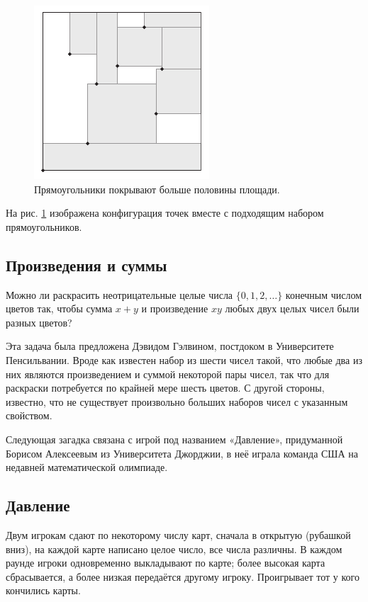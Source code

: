 \begin{figure}[htb!]
\centering
\includegraphics[scale=1]{pics/square}
\caption{Прямоугольники покрывают больше половины площади.}
\label{pic:square}
\end{figure}

На рис. \ref{pic:square} изображена конфигурация точек вместе с подходящим набором прямоугольников.

\subsection*{Произведения и суммы}

Можно ли раскрасить неотрицательные целые числа $\{0,1,2,\dots\}$ конечным числом цветов так, чтобы сумма $x+y$ и произведение $xy$ любых двух целых чисел были разных цветов?

\medskip

Эта задача была предложена Дэвидом Гэлвином, постдоком в Университете Пенсильвании.
Вроде как известен набор из шести чисел такой, что любые два из них являются произведением и суммой некоторой пары чисел, так что для раскраски потребуется по крайней мере шесть цветов.
С другой стороны, известно, что не существует произвольно больших наборов чисел с указанным свойством.

\medskip

Следующая загадка связана с игрой под названием «Давление», придуманной Борисом Алексеевым из Университета Джорджии, в неё играла команда США на недавней математической олимпиаде.

\subsection*{Давление}

Двум игрокам сдают по некоторому числу карт, сначала в открытую (рубашкой вниз),
на каждой карте написано целое число, все числа различны.
В каждом раунде игроки одновременно выкладывают по карте;
более высокая карта сбрасывается, а более низкая передаётся другому игроку.
Проигрывает тот у кого кончились карты.

